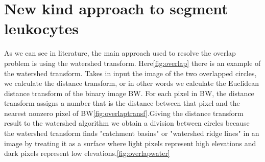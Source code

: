 \section{New kind approach to segment leukocytes}
As we can see in literature, the main approach used to resolve the overlap problem is using the watershed transform. Here\ref{fig:overlap} there is an example of the watershed transform. Takes in input the image of the two overlapped circles, we calculate the distance transform, or in other words we calculate the Euclidean distance transform of the binary image BW. For each pixel in BW, the distance transform assigns a number that is the distance between that pixel and the nearest nonzero pixel of BW\ref{fig:overlaptransf}.Giving the distance transform result to the watershed algorithm we obtain a division between circles because the watershed transform finds "catchment basins" or "watershed ridge lines" in an image by treating it as a surface where light pixels represent high elevations and dark pixels represent low elevations.\ref{fig:overlapwater}

